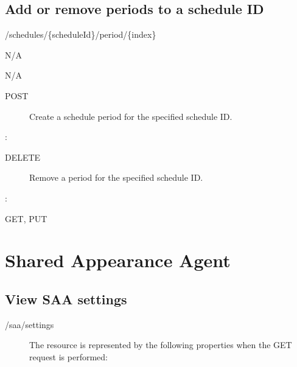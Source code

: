\documentclass[letterpaper,10pt,english]{sphinxmanual}
\begin{document}
\subsection{Add or remove periods to a schedule ID}
\label{\detokenize{restapi:add-or-remove-periods-to-a-schedule-id}}
 /schedules/\{scheduleId\}/period/\{index\}

 N/A

 N/A
\begin{description}
\item[{ POST}] \leavevmode
Create a schedule period for the specified schedule ID.

\end{description}

:

\begin{sphinxVerbatim}[commandchars=\\\{\}]
\end{sphinxVerbatim}
\begin{description}
\item[{ DELETE}] \leavevmode
Remove a period for the specified schedule ID.

\end{description}

:

\begin{sphinxVerbatim}[commandchars=\\\{\}]
\end{sphinxVerbatim}

 GET, PUT


\section{Shared Appearance Agent}
\label{\detokenize{restapi:shared-appearance-agent}}

\subsection{View SAA settings}
\label{\detokenize{restapi:view-saa-settings}}
 /saa/settings
\begin{description}
\item[{}] \leavevmode
The resource is represented by the following properties when the GET request is performed:

\end{description}
\end{document}
